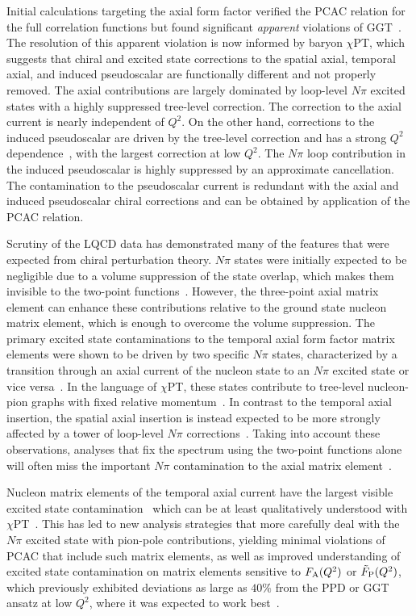 \documentclass{ar-1col}
\begin{document}
Initial calculations targeting the axial form factor verified the PCAC relation
 for the full correlation functions but found significant \emph{apparent} violations
 of GGT~\cite{Ishikawa:2018rew,Gupta:2017dwj,Bali:2018qus}. The resolution of this apparent violation
 is now informed by baryon $\chi$PT, which suggests that chiral
 and excited state corrections to the spatial axial, temporal axial, and induced pseudoscalar
 are functionally different and not properly removed.
The axial contributions are largely dominated by loop-level $N\pi$ excited states
 with a highly suppressed tree-level correction.
The correction to the axial current is nearly independent of $Q^2$.
On the other hand, corrections to the induced pseudoscalar are
 driven by the tree-level correction and has
 a strong $Q^2$ dependence~\cite{Bar:2018xyi}, with the largest correction at low $Q^2$.
The $N\pi$ loop contribution in the induced pseudoscalar is highly suppressed by
 an approximate cancellation.
The contamination to the pseudoscalar current is redundant with the
 axial and induced pseudoscalar chiral corrections and can be obtained
 by application of the PCAC relation.

Scrutiny of the LQCD data has demonstrated many of the features
 that were expected from chiral perturbation theory.
$N\pi$ states were initially expected to be negligible due to a volume suppression
 of the state overlap, which makes them invisible to the two-point functions~\cite{Bar:2016uoj}.
However, the three-point axial matrix element can enhance these contributions relative
 to the ground state nucleon matrix element, which is enough to overcome the volume suppression.
The primary excited state contaminations to the temporal axial form factor matrix elements
 were shown to be driven by two specific $N\pi$ states,
 characterized by a transition through an axial current
 of the nucleon state to an $N\pi$ excited state or vice versa~\cite{Jang:2019vkm}.
In the language of $\chi$PT, these states contribute to tree-level nucleon-pion graphs with fixed relative momentum~\cite{Bar:2018xyi}.
In contrast to the temporal axial insertion, the spatial axial insertion
 is instead expected to be more strongly affected by a tower of loop-level
 $N\pi$ corrections~\cite{Bar:2018xyi}.
Taking into account these observations,
 analyses that fix the spectrum using the two-point functions alone
 will often miss the important $N\pi$ contamination to the
 axial matrix element~\cite{Jang:2019vkm,He:2021yvm}.


Nucleon matrix elements of the temporal axial current have the largest visible excited state contamination~\cite{Jang:2019vkm,RQCD:2019jai} which can be at least qualitatively understood with $\chi$PT~\cite{Bar:2018xyi}.
This has led to new analysis strategies that more carefully deal with the $N\pi$ excited state with pion-pole contributions, yielding minimal violations of PCAC that include such matrix elements, as well as improved understanding of excited state contamination on matrix elements sensitive to $F_{\rm A}(Q^2)$ or $\tilde{F}_{\rm P}(Q^2)$, which previously exhibited deviations as large as $40\%$ from the PPD or GGT
 ansatz at low $Q^2$, where it was expected to
 work best~\cite{Bali:2014nma,Gupta:2017dwj}.
\end{document}
